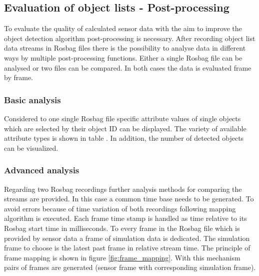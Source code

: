 
\subsection{Evaluation of object lists - Post-processing}
To evaluate the quality of calculated sensor data with the aim to improve the object detection algorithm post-processing is necessary.
After recording object list data streams in Rosbag files there is the possibility to analyse data in different ways by multiple post-processing functions. 
Either a single Rosbag file can be analysed or two files can be compared. In both cases the data is evaluated frame by frame. 


\subsubsection{Basic analysis}

Considered to one single Rosbag file specific attribute values of single objects which are selected by their object \ac{ID} can be displayed. The variety of available attribute types is shown in table 
. In addition, the number of detected objects can be visualized. \\

\subsubsection{Advanced analysis}
\label{sssec:eval}

Regarding two Rosbag recordings further analysis methods for comparing the streams are provided. In this case a common time base needs to be generated. To avoid errors because of time variation of both recordings following mapping algorithm is executed. Each frame time stamp is handled as time relative to its Rosbag start time in milliseconds. To every frame in the Rosbag file which is provided by sensor data a frame of simulation data is dedicated. The simulation frame to choose is the latest past frame in relative stream time. The principle of frame mapping is shown in figure \ref{fig:frame_mapping}. With this mechanism pairs of frames are generated (sensor frame with corresponding simulation frame).

